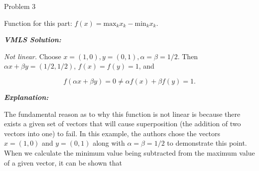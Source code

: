 \begin{problem}{Problem 3}
\begin{highlight}
        Function for this part: $f(x) = \text{max}_{k}x_{k} - \text{min}_{k}x_{k}$. \vspace*{1em}

        \textbf{\textit{VMLS Solution:}} \vspace*{1em}

        \textit{Not linear.} Choose $x = (1,0), y = (0,1), \alpha = \beta = 1/2$. Then $\alpha x + \beta y = (1/2,1/2)$, $f(x) = f(y) = 1$, and
        
        \setcounter{equation}{0}
        \begin{equation}
            f(\alpha x + \beta y) = 0 \neq \alpha f(x) + \beta f(y) = 1.
        \end{equation}

        \textbf{\textit{Explanation:}} \vspace*{1em}

        The fundamental reason as to why this function is not linear is because there exists a given set of vectors that will cause superposition (the addition of two vectors into one) to fail. In this
        example, the authors chose the vectors $x = (1,0)$ and $y = (0,1)$ along with $\alpha = \beta = 1/2$ to demonstrate this point. When we calculate the minimum value being subtracted from the maximum
        value of a given vector, it can be shown that 


\end{highlight}
\end{problem}
